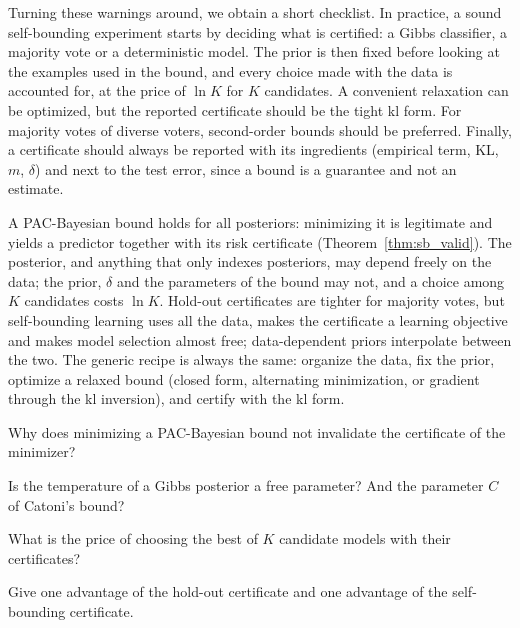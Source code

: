 Turning these warnings around, we obtain a short checklist. In practice, a sound self-bounding experiment starts by deciding what is
certified: a Gibbs classifier, a majority vote or a deterministic model. The
prior is then fixed before looking at the examples used in the bound, and every
choice made with the data is accounted for, at the price of $\ln K$ for $K$
candidates. A convenient relaxation can be optimized, but the reported
certificate should be the tight kl form. For majority votes of diverse voters,
second-order bounds should be preferred. Finally, a certificate should always
be reported with its ingredients (empirical term, KL, $m$, $\delta$) and next to
the test error, since a bound is a guarantee and not an estimate.

\begin{keypoints}
A PAC-Bayesian bound holds for all posteriors: minimizing it is legitimate and
yields a predictor together with its risk certificate (Theorem~\ref{thm:sb_valid}).
The posterior, and anything that only indexes posteriors, may depend freely on the
data; the prior, $\delta$ and the parameters of the bound may not, and a choice
among $K$ candidates costs $\ln K$. Hold-out certificates are tighter for majority
votes, but self-bounding learning uses all the data, makes the certificate a
learning objective and makes model selection almost free; data-dependent priors
interpolate between the two. The generic recipe is always the same: organize the
data, fix the prior, optimize a relaxed bound (closed form, alternating
minimization, or gradient through the kl inversion), and certify with the kl form.
\end{keypoints}

\begin{quickchecks}
\item Why does minimizing a PAC-Bayesian bound not invalidate the certificate of the minimizer?
\item Is the temperature of a Gibbs posterior a free parameter? And the parameter $C$ of Catoni's bound?
\item What is the price of choosing the best of $K$ candidate models with their certificates?
\item Give one advantage of the hold-out certificate and one advantage of the self-bounding certificate.
\end{quickchecks}

